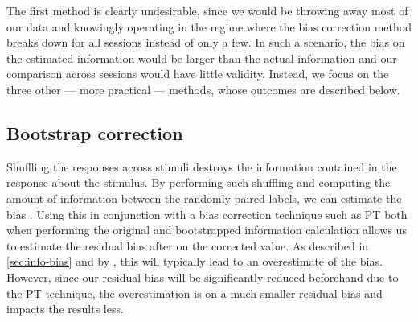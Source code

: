 The first method is clearly undesirable, since we would be throwing away most of our data and knowingly operating in the regime where the bias correction method breaks down for all sessions instead of only a few.
In such a scenario, the bias on the estimated information would be larger than the actual information and our comparison across sessions would have little validity.
Instead, we focus on the three other --- more practical --- methods, whose outcomes are described below.


\subsection{Bootstrap correction}
\label{sec:pl_bootstrapping}

Shuffling the responses across stimuli destroys the information contained in the response about the stimulus.
By performing such shuffling and computing the amount of information between the randomly paired labels, we can estimate the bias \citep{Optican1991}.
Using this in conjunction with a bias correction technique such as \ac{PT} both when performing the original and bootstrapped information calculation allows us to estimate the residual bias after on the corrected value.
As described in \autoref{sec:info-bias} and by \citet{Panzeri1996}, this will typically lead to an overestimate of the bias.
However, since our residual bias will be significantly reduced beforehand due to the \ac{PT} technique, the overestimation is on a much smaller residual bias and impacts the results less.

